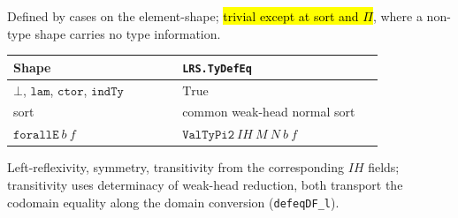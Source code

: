 \begin{definition}
\label{def:expa-lrs-tydefeq}
\leanok
{}

 Defined by cases on the element-shape; \hl{trivial except at sort and $\Pi$}, where a
non-type shape carries no type information.
\begin{center}
\begin{tabular}{p{0.42\linewidth}p{0.50\linewidth}}
\toprule
Shape & \texttt{LRS.TyDefEq} \\
\midrule
$\bot$, $\mathtt{lam}$, $\mathtt{ctor}$, $\mathtt{indTy}$ & $\mathrm{True}$ \\
sort & common weak-head normal sort \\
$\mathtt{forallE}\ b\ f$ & $\mathtt{ValTyPi2}\ \mathit{IH}\ M\ N\ b\ f$ \\
\bottomrule
\end{tabular}\par\smallskip
\end{center}
Left-reflexivity, symmetry, transitivity from the corresponding $\mathit{IH}$ fields; transitivity
uses determinacy of weak-head reduction, both transport the codomain equality along the domain
conversion (\texttt{defeqDF\_l}).
\end{definition}

